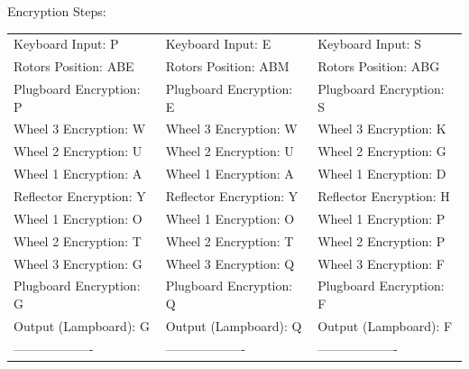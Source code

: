 \documentclass{article}
\begin{document}

Encryption Steps:

\begin{tabular}{lll}
Keyboard Input: P & Keyboard Input: E & Keyboard Input: S \\
Rotors Position: ABE & Rotors Position: ABM & Rotors Position: ABG \\
Plugboard Encryption: P & Plugboard Encryption: E & Plugboard Encryption: S \\
Wheel 3 Encryption: W & Wheel 3 Encryption: W & Wheel 3 Encryption: K \\
Wheel 2 Encryption: U & Wheel 2 Encryption: U & Wheel 2 Encryption: G \\
Wheel 1 Encryption: A & Wheel 1 Encryption: A & Wheel 1 Encryption: D \\
Reflector Encryption: Y & Reflector Encryption: Y & Reflector Encryption: H \\
Wheel 1 Encryption: O & Wheel 1 Encryption: O & Wheel 1 Encryption: P \\
Wheel 2 Encryption: T & Wheel 2 Encryption: T & Wheel 2 Encryption: P \\
Wheel 3 Encryption: G & Wheel 3 Encryption: Q & Wheel 3 Encryption: F \\
Plugboard Encryption: G & Plugboard Encryption: Q & Plugboard Encryption: F \\
Output (Lampboard): G & Output (Lampboard): Q & Output (Lampboard): F \\
------------------- & ------------------- & -------------------
\end{tabular}
\end{document}
